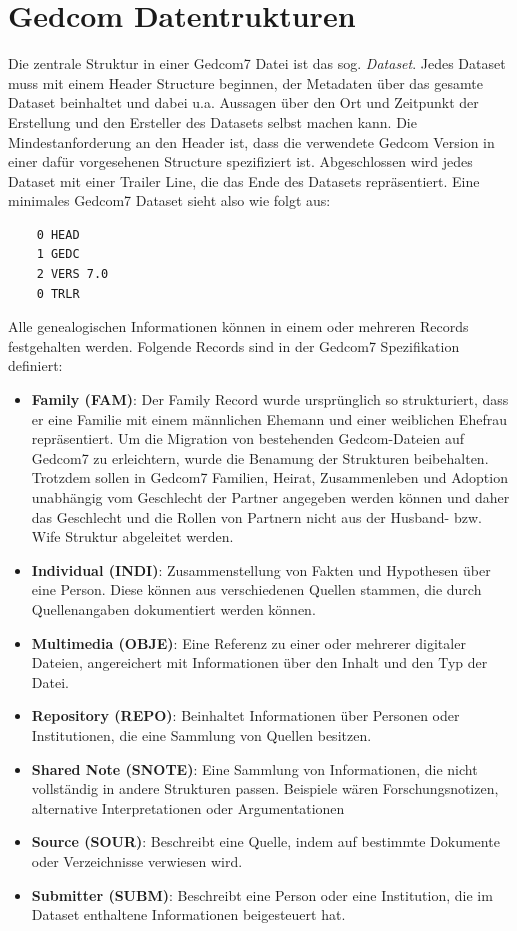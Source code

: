 \section{Gedcom Datentrukturen}
\label{sec: Konzept - Gedcom Strukturen}
Die zentrale Struktur in einer Gedcom7 Datei ist das sog. \textit{Dataset}. Jedes Dataset muss mit einem Header Structure beginnen, der Metadaten über das gesamte Dataset beinhaltet und dabei u.a. Aussagen über den Ort und Zeitpunkt der Erstellung und den Ersteller des Datasets selbst machen kann. Die Mindestanforderung an den Header ist, dass die verwendete Gedcom Version in einer dafür vorgesehenen Structure spezifiziert ist. Abgeschlossen wird jedes Dataset mit einer Trailer Line, die das Ende des Datasets repräsentiert. Eine minimales Gedcom7 Dataset sieht also wie folgt aus:
\newpage
{
\begin{lstlisting}
	0 HEAD
	1 GEDC
	2 VERS 7.0
	0 TRLR
\end{lstlisting}
\label{lst: minimales dataset}
}
\vspace{1em}
Alle genealogischen Informationen können in einem oder mehreren Records festgehalten werden. Folgende Records sind in der Gedcom7 Spezifikation definiert:
\begin{itemize}
	\label{liste records}
	\item \textbf{Family (FAM)}: Der Family Record wurde ursprünglich so strukturiert, dass er eine Familie mit einem männlichen Ehemann und einer weiblichen Ehefrau repräsentiert. Um die Migration von bestehenden Gedcom-Dateien auf Gedcom7 zu erleichtern, wurde die Benamung der Strukturen beibehalten. Trotzdem sollen in Gedcom7 Familien, Heirat, Zusammenleben und Adoption unabhängig vom Geschlecht der Partner angegeben werden können und daher das Geschlecht und die Rollen von Partnern nicht aus der Husband- bzw. Wife Struktur abgeleitet werden.
	\item \textbf{Individual (INDI)}: Zusammenstellung von Fakten und Hypothesen über eine Person. Diese können aus verschiedenen Quellen stammen, die durch Quellenangaben dokumentiert werden können.
	\item \textbf{Multimedia (OBJE)}: Eine Referenz zu einer oder mehrerer digitaler Dateien, angereichert mit Informationen über den Inhalt und den Typ der Datei.
	\item \textbf{Repository (REPO)}: Beinhaltet Informationen über Personen oder Institutionen, die eine Sammlung von Quellen besitzen.
	\item \textbf{Shared Note (SNOTE)}: Eine Sammlung von Informationen, die nicht vollständig in andere Strukturen passen. Beispiele wären Forschungsnotizen, alternative Interpretationen oder Argumentationen
	\item \textbf{Source (SOUR)}: Beschreibt eine Quelle, indem auf bestimmte Dokumente oder Verzeichnisse verwiesen wird.
	\item \textbf{Submitter (SUBM)}: Beschreibt eine Person oder eine Institution, die im Dataset enthaltene Informationen beigesteuert hat.
\end{itemize}
